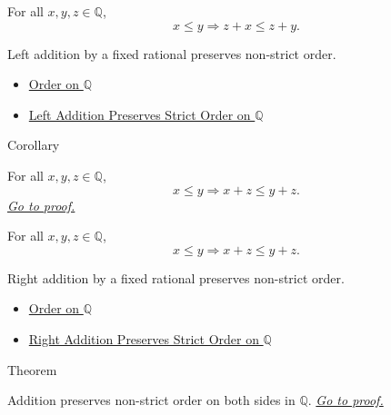 \begin{remark*}
For all $x,y,z\in\mathbb{Q}$,
\[
x\le y\Longrightarrow z+x\le z+y.
\]
\end{remark*}

\begin{remark*}[Interpretation]
Left addition by a fixed rational preserves non-strict order.
\end{remark*}

\begin{dependencies}
\begin{itemize}
  \item \hyperref[def:order-on-q]{Order on $\mathbb{Q}$}
  \item \hyperref[thm:left-addition-preserves-strict-order-on-q]{Left Addition Preserves Strict Order on $\mathbb{Q}$}
\end{itemize}
\end{dependencies}

\begin{corollarybox}{Corollary}
\begin{corollary}
\label{cor:right-addition-preserves-order-on-q}
For all $x,y,z\in\mathbb{Q}$,
\[
x\le y \Longrightarrow x+z\le y+z.
\]
\hyperref[prf:right-addition-preserves-order-on-q]{\textit{Go to proof.}}
\end{corollary}
\end{corollarybox}

\begin{remark*}
For all $x,y,z\in\mathbb{Q}$,
\[
x\le y\Longrightarrow x+z\le y+z.
\]
\end{remark*}

\begin{remark*}[Interpretation]
Right addition by a fixed rational preserves non-strict order.
\end{remark*}

\begin{dependencies}

\begin{itemize}
  \item \hyperref[def:order-on-q]{Order on $\mathbb{Q}$}
  \item \hyperref[cor:right-addition-preserves-strict-order-on-q]{Right Addition Preserves Strict Order on $\mathbb{Q}$}
\end{itemize}
\end{dependencies}

\begin{theorembox}{Theorem}
\begin{theorem}
\label{thm:addition-preserves-order-on-q}
Addition preserves non-strict order on both sides in $\mathbb{Q}$.
\hyperref[prf:addition-preserves-order-on-q]{\textit{Go to proof.}}
\end{theorem}
\end{theorembox}

